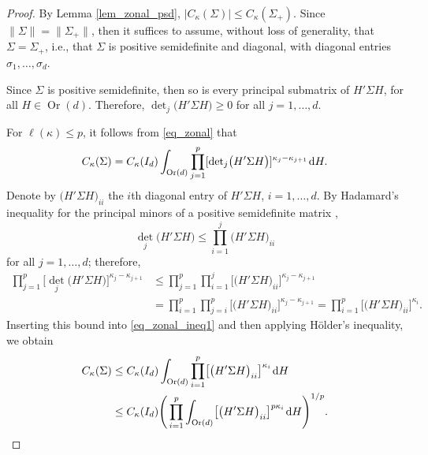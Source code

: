\documentclass[11pt]{article}
\numberwithin{equation}{section}
\numberwithin{equation}{section}
\def\dd {\hskip1pt\mathrm{d}}
\def\Or{\mathop{\mathrm{Or}}}
\begin{document}
\begin{proof}
By Lemma \ref{lem_zonal_psd}, $|C_\kappa(\Sigma)| \le C_\kappa(\Sigma_+)$. Since $\|\Sigma\| = \|\Sigma_+\|$, then it suffices to assume, without loss of generality, that $\Sigma = \Sigma_+$, i.e., that $\Sigma$ is positive semidefinite and diagonal, with diagonal entries $\sigma_1,\ldots,\sigma_d$.

Since $\Sigma$ is positive semidefinite, then so is every principal submatrix of $H'\Sigma H$, for all ${H \in \Or(d)}$. Therefore, ${\det}_j\bigl(H'\Sigma H\bigr) \ge 0$ for all $j=1,\ldots,d$.

For $\ell(\kappa) \le p$, it follows from \eqref{eq_zonal} that
\begin{equation}
\label{eq_zonal_ineq1}
C_\kappa(\Sigma) = C_\kappa(I_d) \int_{\Or(d)} \prod_{j=1}^p [{\det}_j\bigl(H'\Sigma H\bigr)]^{\kappa_j-\kappa_{j+1}} \dd H.
\end{equation}
Denote by $\bigl(H'\Sigma H\bigr)_{ii}$ the $i$th diagonal entry of $H'\Sigma H$, $i=1,\ldots,d$. By Hadamard's inequality for the principal minors of a positive semidefinite matrix \cite[p.~505]{Horn},
\[
{\det}_j\bigl(H'\Sigma H\bigr) \le \prod_{i=1}^j \bigl(H'\Sigma H\bigr)_{ii}
\]
for all $j=1,\ldots,d$; therefore,
\begin{align*}
\prod_{j=1}^p \bigl[{\det}_j\bigl(H'\Sigma H\bigr)\bigr]^{\kappa_j-\kappa_{j+1}} &\le \prod_{j=1}^p \prod_{i=1}^j \bigl[\bigl(H'\Sigma H\bigr)_{ii}\bigr]^{\kappa_j-\kappa_{j+1}} \\
&= \prod_{i=1}^p \prod_{j=i}^p \bigl[\bigl(H'\Sigma H\bigr)_{ii}\bigr]^{\kappa_j-\kappa_{j+1}}
= \prod_{i=1}^p \bigl[\bigl(H'\Sigma H\bigr)_{ii}\bigr]^{\kappa_i}.
\end{align*}
Inserting this bound into \eqref{eq_zonal_ineq1} and then applying H\"older's inequality, we obtain
\begin{align}
C_\kappa(\Sigma) &\le C_\kappa(I_d) \int_{\Or(d)} \prod_{i=1}^p \bigl[\bigl(H'\Sigma H\bigr)_{ii}\bigr]^{\kappa_i} \dd H \nonumber \\
&\le C_\kappa(I_d) \Bigg(\prod_{i=1}^p \int_{\Or(d)} \bigl[\bigl(H'\Sigma H\bigr)_{ii}\bigr]^{p \kappa_i} \dd H\Bigg)^{1/p}.\label{eq_zonal_Holder}
\end{align}


\end{proof}
\end{document}
